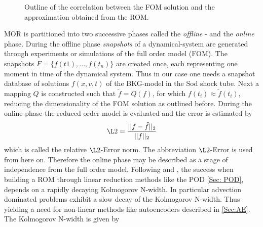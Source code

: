\begin{figure}[H]
	\begin{subfigure}{.45\textwidth}
		\centering
		
	\end{subfigure}\hfill
	\begin{subfigure}{.45\textwidth}
		\centering
		
	\end{subfigure}
	\caption{Outline of the correlation between the FOM solution and the approximation obtained from the ROM.}
\end{figure}
MOR is partitioned into two successive phases called the \textit{offline} - and the \textit{online} phase. During the offline phase \textit{snapshots} of a dynamical-system are generated through experiments or simulations of the full order model (FOM). The snapshots \(F = \{f(t1),...,f(t_n)\}\) are created once, each representing one moment in time of the dynamical system. Thus in our case one needs a snapshot database of solutions \(f(x,v,t)\) of the BKG-model in the Sod shock tube. Next a mapping \(Q\) is constructed such that \(\tilde{f} = Q(f)\), for which \(f(t_i) \approx \tilde{f}(t_i)\), reducing the dimensionality of the FOM solution as outlined before. During the online phase the reduced order model is evaluated and the error is estimated by 
\begin{equation}
	\L2 = \frac{||f - \tilde{f} ||_2}{||f||_2}
\end{equation}
which is called the relative \(\L2\)-Error norm. The abbreviation \(\L2\)-Error is used from here on. Therefore the online phase may be described as a stage of independence from the full order model.
Following \cite{ohlberger2015reduced} and \cite{Carlberg}, the success when building a ROM through linear reduction methods like the POD \cref{Sec: POD}, depends on a rapidly decaying Kolmogorov N-width. In particular advection dominated problems exhibit a slow decay of the Kolmogorov N-width. Thus yielding a need for non-linear methods like autoencoders described in \cref{Sec:AE}. The Kolmogorov N-width is given by
